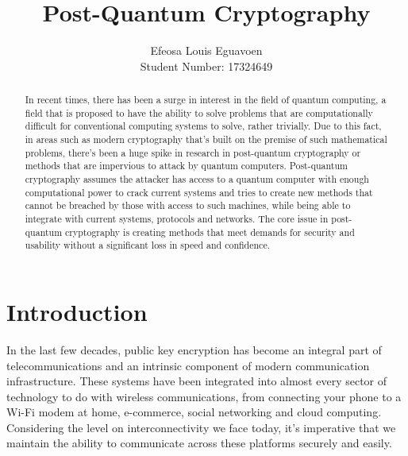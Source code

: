 \documentclass[10pt,a4paper]{article}
\author{Efeosa Louis Eguavoen \\ Student Number: 
17324649}
\title{Post-Quantum Cryptography}
\begin{document}
\maketitle
\begin{abstract}
In recent times, there has been a surge in interest in the field of quantum computing, a field that is proposed to have the ability to solve problems that are computationally difficult for conventional computing systems to solve, rather trivially. Due to this fact, in areas such as modern cryptography that's built on the premise of such mathematical problems, there's been a huge spike in research in post-quantum cryptography or methods that are impervious to attack by quantum computers. Post-quantum cryptography assumes the attacker has access to a quantum computer with enough computational power to crack current systems and tries to create new methods that cannot be breached by those with access to such machines, while being able to integrate with current systems, protocols and networks. The core issue in post-quantum cryptography is creating methods that meet demands for security and usability without a significant loss in speed and confidence.
\end{abstract} 
\section{Introduction}
In the last few decades, public key encryption has become an integral part of telecommunications and an intrinsic component of modern communication infrastructure. These systems have been integrated into almost every sector of technology to do with wireless communications, from connecting your phone to a Wi-Fi modem at home, e-commerce, social networking and cloud computing. Considering the level on interconnectivity we face today, it's imperative that we maintain the ability to communicate across these platforms securely and easily.
\newline
\newline
\end{document}
